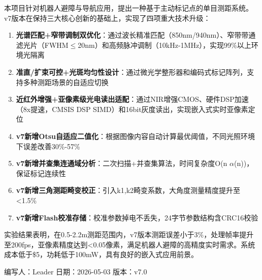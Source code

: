 \documentclass[12pt,a4paper]{article}
\begin{document}
本项目针对机器人避障与导航应用，提出一种基于主动标记点的单目测距系统。v7版本在保持三大核心创新的基础上，实现了四项重大技术升级：

\begin{enumerate}
\item \textbf{光谱匹配+窄带调制双优化}：通过波长精准匹配（850nm/940nm）、窄带带通滤光片（FWHM$\le$20nm）和高频脉冲调制（10kHz-1MHz），实现99\%以上环境光隔离
\item \textbf{准直/扩束可控+光斑均匀性设计}：通过微光学整形器和编码式标记阵列，支持多种测距场景的自适应切换
\item \textbf{近红外增强+亚像素级光电读出适配}：通过NIR增强CMOS、硬件DSP加速（8x提速，CMSIS DSP SIMD）和16bit灰度读出，实现嵌入式实时亚像素定位
\item \textbf{v7新增Otsu自适应二值化}：根据图像内容自动计算最优阈值，不同光照环境下误差改善30\%-57\%
\item \textbf{v7新增并查集连通域分析}：二次扫描+并查集算法，时间复杂度O(n $\alpha$(n))，保证标记连续性
\item \textbf{v7新增三角测距畸变校正}：引入k1,k2畸变系数，大角度测量精度提升至<1.5\%
\item \textbf{v7新增Flash校准存储}：校准参数掉电不丢失，24字节参数结构含CRC16校验
\end{enumerate}

实验结果表明，在0.5-2.2m测距范围内，v7版本测距误差小于3\%，处理帧率提升至200fps，亚像素精度达到<0.05像素，满足机器人避障的高精度实时需求。系统成本低于\$5，功耗低于100mW，具有良好的嵌入式应用前景。

\vfill
\begin{center}
编写人：Leader \hspace{2cm} 日期：2026-05-03 \hspace{2cm} 版本：v7.0
\end{center}
\end{document}
